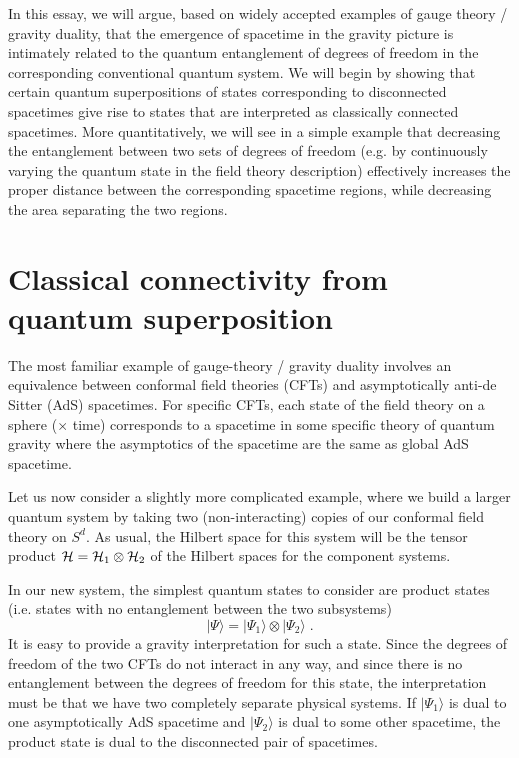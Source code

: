 \documentclass[12pt,epsf]{article}
\renewcommand{\(}{\left(}
\renewcommand{\)}{\right)}
\begin{document}
In this essay, we will argue, based on widely accepted examples of gauge theory / gravity duality, that the emergence of spacetime in the gravity picture is intimately related to the quantum entanglement of degrees of freedom in the corresponding conventional quantum system. We will begin by showing that certain quantum superpositions of states corresponding to disconnected spacetimes give rise to states that are interpreted as classically connected spacetimes.  More quantitatively, we will see in a simple example that decreasing the entanglement between two sets of degrees of freedom (e.g. by continuously varying the quantum state in the field theory description) effectively increases the proper distance between the corresponding spacetime regions, while decreasing the area separating the two regions.

\section{Classical connectivity from quantum superposition}

The most familiar example of gauge-theory / gravity duality involves an equivalence between conformal field theories (CFTs) and asymptotically anti-de Sitter (AdS) spacetimes. For specific CFTs, each state of the field theory on a sphere ($\times$ time) corresponds to a spacetime in some specific theory of quantum gravity where the asymptotics of the spacetime are the same as global AdS spacetime.

Let us now consider a slightly more complicated example, where we build a larger quantum system by taking two (non-interacting) copies of our conformal field theory on $S^d$. As usual, the Hilbert space for this system will be the tensor product ${\cal H} = {\cal H}_1 \otimes {\cal H}_2$ of the Hilbert spaces for the component systems.

In our new system, the simplest quantum states to consider are product states (i.e. states with no entanglement between the two subsystems)
\[
|\Psi \rangle = |\Psi_1 \rangle \otimes |\Psi_2 \rangle \; .
\]
It is easy to provide a gravity interpretation for such a state. Since the degrees of freedom of the two CFTs do not interact in any way, and since there is no entanglement between the degrees of freedom for this state, the interpretation must be that we have two completely separate physical systems. If $|\Psi_1 \rangle$ is dual to one asymptotically AdS spacetime and $|\Psi_2 \rangle$ is dual to some other spacetime, the product state is dual to the disconnected pair of spacetimes.
\end{document}
